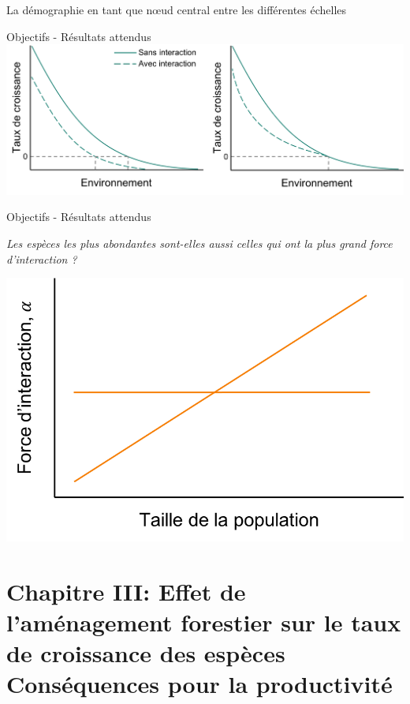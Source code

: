 \documentclass[11pt, compress, aspectratio=1610]{beamer}
\begin{document}
\begin{frame}{La démographie en tant que nœud central entre les
différentes échelles}
\begin{frame}{Objectifs - Résultats attendus}
\includegraphics[scale=0.45]{figures/output_chap2b.png}

\par

\end{frame}

\begin{frame}{Objectifs - Résultats attendus}
\protect\hypertarget{objectifs---ruxe9sultats-attendus-2}{}

\centering

\emph{Les espèces les plus abondantes sont-elles aussi celles qui ont la
plus grand force d’interaction ?}

\vspace*{10mm}
\centering

\includegraphics[scale=0.5]{figures/output_chap2c.png}

\par

\end{frame}

\hypertarget{chapitre-iii-effet-de-lamuxe9nagement-forestier-sur-le-taux-de-croissance-des-espuxe8ces-consuxe9quences-pour-la-productivituxe9}{%
\section{\texorpdfstring{Chapitre III: \newline Effet de l’aménagement
forestier sur le taux de croissance des espèces
\newline \large Conséquences pour la
productivité}{Chapitre III: Effet de l’aménagement forestier sur le taux de croissance des espèces Conséquences pour la productivité}}\label{chapitre-iii-effet-de-lamuxe9nagement-forestier-sur-le-taux-de-croissance-des-espuxe8ces-consuxe9quences-pour-la-productivituxe9}}


\end{frame}
\end{document}
